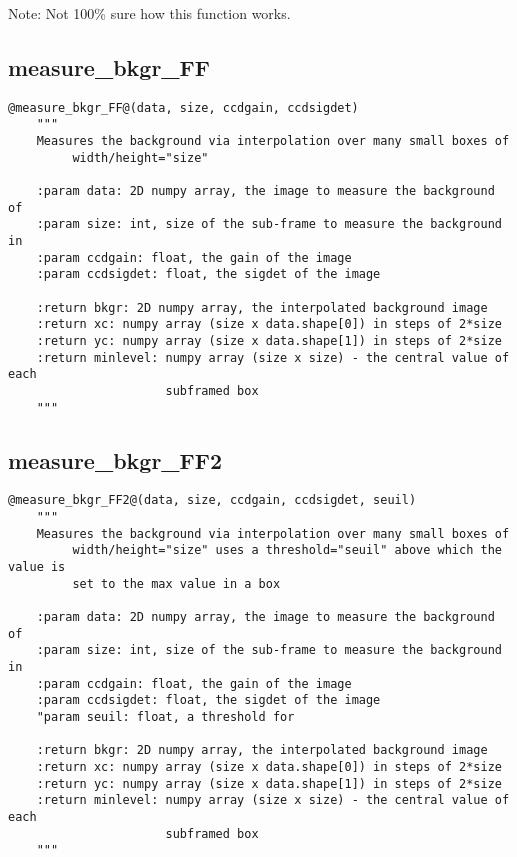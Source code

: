 \noindent Note: Not 100\% sure how this function works. \\

\subsection{measure\_bkgr\_FF}

\begin{lstlisting}[style=pythonstyle]
@measure_bkgr_FF@(data, size, ccdgain, ccdsigdet)
    """
    Measures the background via interpolation over many small boxes of 
         width/height="size"
    
    :param data: 2D numpy array, the image to measure the background of
    :param size: int, size of the sub-frame to measure the background in
    :param ccdgain: float, the gain of the image
    :param ccdsigdet: float, the sigdet of the image
    
    :return bkgr: 2D numpy array, the interpolated background image
    :return xc: numpy array (size x data.shape[0]) in steps of 2*size
    :return yc: numpy array (size x data.shape[1]) in steps of 2*size
    :return minlevel: numpy array (size x size) - the central value of each
                      subframed box
    """
\end{lstlisting}


\subsection{measure\_bkgr\_FF2}

\begin{lstlisting}[style=pythonstyle]
@measure_bkgr_FF2@(data, size, ccdgain, ccdsigdet, seuil)
    """
    Measures the background via interpolation over many small boxes of 
         width/height="size" uses a threshold="seuil" above which the value is
         set to the max value in a box

    :param data: 2D numpy array, the image to measure the background of
    :param size: int, size of the sub-frame to measure the background in
    :param ccdgain: float, the gain of the image
    :param ccdsigdet: float, the sigdet of the image
    "param seuil: float, a threshold for 

    :return bkgr: 2D numpy array, the interpolated background image
    :return xc: numpy array (size x data.shape[0]) in steps of 2*size
    :return yc: numpy array (size x data.shape[1]) in steps of 2*size
    :return minlevel: numpy array (size x size) - the central value of each
                      subframed box
    """
\end{lstlisting}


